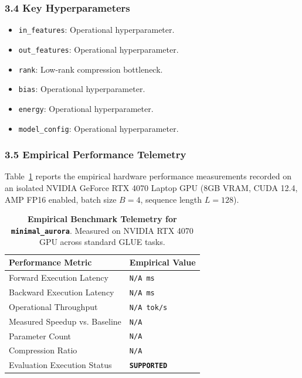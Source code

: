 \subsubsection*{3.4 Key Hyperparameters}
\begin{itemize}
    \item \texttt{in\_features}: Operational hyperparameter.
    \item \texttt{out\_features}: Operational hyperparameter.
    \item \texttt{rank}: Low-rank compression bottleneck.
    \item \texttt{bias}: Operational hyperparameter.
    \item \texttt{energy}: Operational hyperparameter.
    \item \texttt{model\_config}: Operational hyperparameter.
\end{itemize}

\subsubsection*{3.5 Empirical Performance Telemetry}
Table~\ref{tab:telemetry_minimal\_aurora} reports the empirical hardware performance measurements recorded on an isolated NVIDIA GeForce RTX 4070 Laptop GPU (8GB VRAM, CUDA 12.4, AMP FP16 enabled, batch size $B=4$, sequence length $L=128$).

\begin{table}[h]
\centering
\small
\caption{\textbf{Empirical Benchmark Telemetry for \texttt{minimal\_aurora}}. Measured on NVIDIA RTX 4070 GPU across standard GLUE tasks.}
\label{tab:telemetry_minimal\_aurora}
\begin{tabularx}{\columnwidth}{lX}
\toprule
\textbf{Performance Metric} & \textbf{Empirical Value} \\
\midrule
Forward Execution Latency & \texttt{N/A ms} \\
Backward Execution Latency & \texttt{N/A ms} \\
Operational Throughput & \texttt{N/A tok/s} \\
Measured Speedup vs. Baseline & \texttt{N/A} \\
Parameter Count & \texttt{N/A} \\
Compression Ratio & \texttt{N/A} \\
Evaluation Execution Status & \textbf{\texttt{SUPPORTED}} \\
\bottomrule
\end{tabularx}
\end{table}

